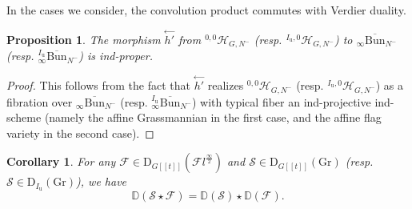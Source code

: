 \documentclass[11pt]{amsart}
\theoremstyle{plain}
\newtheorem{coro}[thm]{Corollary}
\newtheorem{prop}[thm]{Proposition}
\theoremstyle{remark}
\numberwithin{equation}{section}
\begin{document}
	In the cases we consider, the convolution product commutes with Verdier duality.
	\begin{prop}
		The morphism $\overset{\leftarrow}{h'}$ from $^{0,0}\mathcal{H}_{G,N^{-}}$ (resp. $^{I_{\mathrm{u}},0}\mathcal{H}_{G,N^{-}}$) to $_\infty\overline{\mathrm{Bun}}_{N^-}$ (resp. $^{I_{\mathrm{u}}}_\infty\overline{\mathrm{Bun}}_{N^-}$)  is ind-proper.
	\end{prop}
	\begin{proof}
		This follows from the fact that $\overset{\leftarrow}{h'}$ realizes $^{0,0}\mathcal{H}_{G,N^{-}}$ (resp. $^{I_{\mathrm{u}},0}\mathcal{H}_{G,N^{-}}$) as a fibration over $_\infty\overline{\mathrm{Bun}}_{N^-}$ (resp. $^{I_{\mathrm{u}}}_\infty\overline{\mathrm{Bun}}_{N^-}$) with typical fiber an ind-projective ind-scheme (namely the affine Grassmannian in the first case, and the affine flag variety in the second case).
	\end{proof}
	\begin{coro}\label{verdier coro}
		For any $\mathcal{F}\in\mathrm{D}_{G[[t]]}(\mathcal{F}l^{\frac{\infty}{2}})$ and $\mathcal{S}\in \mathrm{D}_{G[[t]]}(\mathrm{Gr})$ (resp. $\mathcal{S}\in  \mathrm{D}_{I_\mathrm{u}}(\mathrm{Gr})$), we have 
		$$\mathbb{D}(\mathcal{S}\star\mathcal{F})=\mathbb{D}(\mathcal{S})\star\mathbb{D}(\mathcal{F}).$$
	\end{coro}
\end{document}
